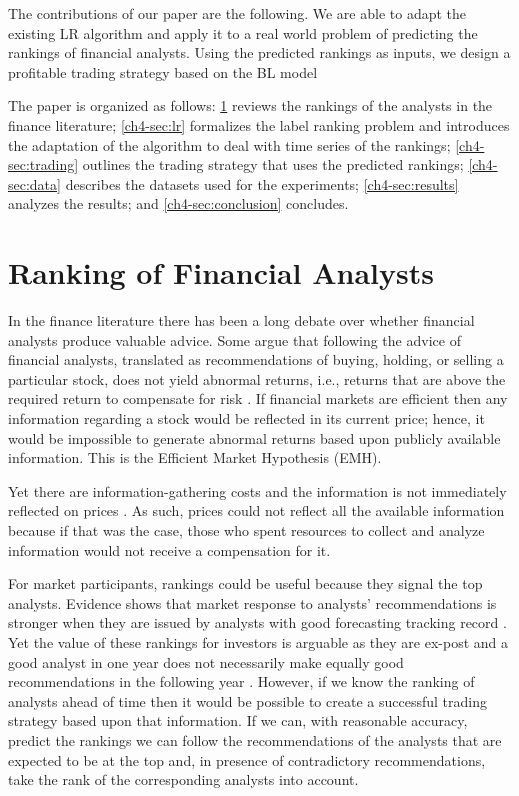 \documentclass{llncs}\usepackage[]{graphicx}\usepackage[]{color}
\begin{document}
The contributions of our paper are the following. We are able to adapt the existing LR algorithm and apply it to a real world problem of predicting the rankings of  financial analysts. Using the predicted rankings as inputs, we  design a profitable trading strategy based on the BL model

The paper is organized as follows: \ref{ch4-sec:ranking} reviews the rankings of the analysts in  the finance literature; \ref{ch4-sec:lr} formalizes the label ranking problem and introduces the adaptation of the algorithm to deal with time series of the rankings; \ref{ch4-sec:trading} outlines the trading strategy that uses the predicted rankings; \ref{ch4-sec:data} describes the datasets used for the experiments; \ref{ch4-sec:results} analyzes the results; and \ref{ch4-sec:conclusion} concludes.

\section{Ranking of Financial  Analysts}
\label{ch4-sec:ranking}

In the finance literature there has been a long debate over whether financial analysts produce valuable  advice. Some argue that following the advice of financial analysts,  translated as recommendations of buying, holding, or selling a particular stock, does not yield  abnormal returns, i.e.,  returns that are above the required return to compensate for risk \cite{fama1970ecm}. If financial markets are efficient then any information  regarding a stock would  be reflected in its current price; hence, it would be  impossible to generate abnormal returns based upon publicly available information. This is the Efficient Market Hypothesis (EMH).

Yet there are information-gathering costs and the information is not immediately reflected on prices  \cite{grossman1980iie}. As such, prices could not  reflect all the available information because if that was the case, those who spent resources to collect and analyze   information would not receive a compensation for it.

For  market participants, rankings could be useful because they signal the top analysts. Evidence shows that market response to analysts' recommendations is stronger when they are  issued by  analysts with good forecasting tracking record \cite{park2000analyst}. Yet the value of these rankings for investors is arguable as they are ex-post and a good analyst in one year does not necessarily make equally good recommendations in the following year \cite{emery2009}. However, if we know the ranking of analysts ahead of time  then it would be possible to create a successful trading strategy based upon that information. If we can, with reasonable accuracy, predict the rankings  we can follow the recommendations of the analysts that are expected to be at the top and, in presence of contradictory recommendations, take the rank of the corresponding analysts into account.
\end{document}
